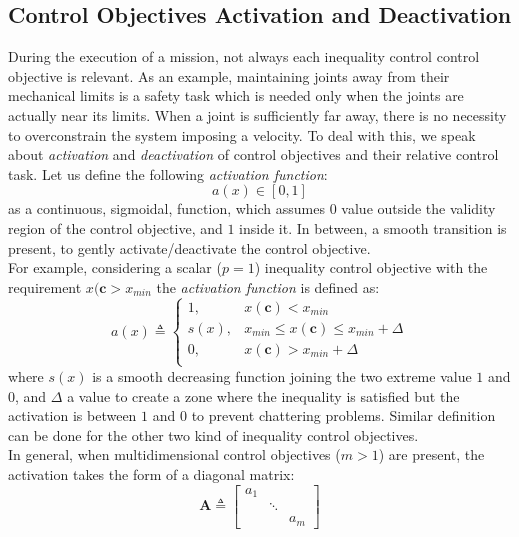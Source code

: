 
\subsection{Control Objectives Activation and Deactivation}
\label{sec:activations}
During the execution of a mission, not always each inequality control control objective is relevant. As an example, maintaining joints away from their mechanical limits is a safety task which is needed only when the joints are actually near its limits. When a joint is sufficiently far away, there is no necessity to overconstrain the system imposing a velocity. To deal with this, we speak about \textit{activation} and \textit{deactivation} of control objectives and their relative control task.
Let us define the following \textit{activation function}:
\begin{equation}
	a(x) \in [0,1]
\end{equation}
as a continuous, sigmoidal, function, which assumes $0$ value outside the validity region of the control objective, and $1$ inside it. In between, a smooth transition is present, to gently activate/deactivate the control objective. \\
For example, considering a scalar ($ p = 1 $) inequality control objective with the requirement $x(\boldsymbol{c} > x_{min}$ the \textit{activation function} is defined as:
\begin{equation}
	\label{eq_activation_f}
	a(x) \triangleq
	\begin{cases}1,& x(\boldsymbol{c}) < x_{min}\\
	s(x),& x_{min} \leq x(\boldsymbol{c}) \leq x_{min} + \Delta\\
	0, & x(\boldsymbol{c}) > x_{min} + \Delta\\
	\end{cases}
\end{equation}    
where $s(x)$ is a smooth decreasing function joining the two extreme value $1$ and $0$, and $\Delta$ a value to create a zone where the inequality is satisfied but the activation is between $1$ and $0$ to prevent chattering problems. Similar definition can be done for the other two kind of inequality control objectives.\\

In general, when multidimensional control objectives ($m > 1$) are present, the activation takes the form of a diagonal matrix:
\begin{equation}
\boldsymbol{A} \triangleq
	\begin{bmatrix}
	a_1 & & \\
	& \ddots & \\
	& & a_m	 
	\end{bmatrix}
\end{equation}

